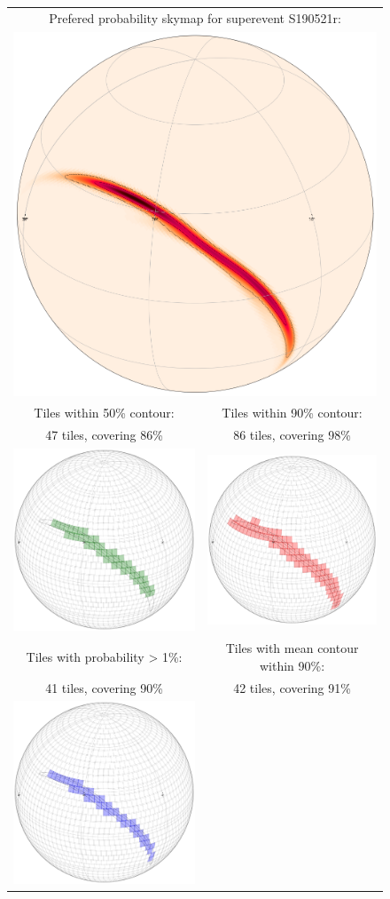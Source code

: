 \begin{colsection}
\begin{colsection}
\begin{figure}[p]
\begin{center}
\begin{tabular}{cc}
\multicolumn{2}{c}{Prefered probability skymap for superevent S190521r:}
\\
\multicolumn{2}{c}{\includegraphics[width=0.5\linewidth]{images/tiling/1_0.png}}
\\
Tiles within 50\% contour: &
Tiles within 90\% contour:
\\
47 tiles, covering 86\% &
86 tiles, covering 98\%
\\
\includegraphics[width=0.25\linewidth]{images/tiling/1_c.png} &
\includegraphics[width=0.25\linewidth]{images/tiling/1_d.png}
\\
Tiles with probability > 1\%: &
Tiles with mean contour within 90\%:
\\
41 tiles, covering 90\% &
42 tiles, covering 91\%
\\
\includegraphics[width=0.25\linewidth]{images/tiling/1_a.png} &

\end{tabular}
\end{center}
\end{figure}
\end{colsection}
\end{colsection}
